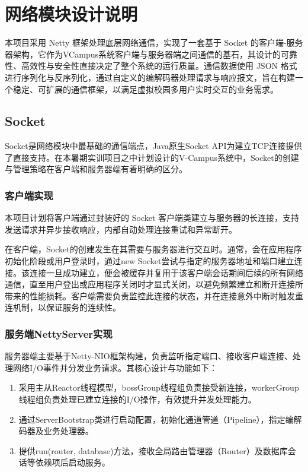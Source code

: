 \ifx\maindoc\undefined
\fi

\section{网络模块设计说明}
本项目采用 Netty 框架处理底层网络通信，实现了一套基于 Socket 的客户端-服务器架构，它作为VCampus系统客户端与服务器端之间通信的基石，其设计的可靠性、高效性与安全性直接决定了整个系统的运行质量。通信数据使用 JSON 格式进行序列化与反序列化，通过自定义的编解码器处理请求与响应报文，旨在构建一个稳定、可扩展的通信框架，以满足虚拟校园多用户实时交互的业务需求。

\subsection{Socket}
Socket是网络模块中最基础的通信端点，Java原生Socket API为建立TCP连接提供了直接支持。在本暑期实训项目之中计划设计的V-Campus系统中，Socket的创建与管理策略在客户端和服务器端有着明确的区分。

\subsubsection{客户端实现}
本项目计划将客户端通过封装好的 Socket 客户端类建立与服务器的长连接，支持发送请求并异步接收响应，内部自动处理连接重试和异常断开。

在客户端，Socket的创建发生在其需要与服务器进行交互时。通常，会在应用程序初始化阶段或用户登录时，通过new Socket尝试与指定的服务器地址和端口建立连接。该连接一旦成功建立，便会被缓存并复用于该客户端会话期间后续的所有网络通信，直至用户登出或应用程序关闭时才显式关闭，以避免频繁建立和断开连接所带来的性能损耗。客户端需要负责监控此连接的状态，并在连接意外中断时触发重连机制，以保证服务的连续性。

\subsubsection{服务端\textbf{NettyServer}实现}
服务器端主要基于Netty-NIO框架构建，负责监听指定端口、接收客户端连接、处理网络I/O事件并分发业务请求。其核心设计与功能如下：
\begin{enumerate}
    \item 采用主从Reactor线程模型，bossGroup线程组负责接受新连接，workerGroup线程组负责处理已建立连接的I/O操作，有效提升并发处理能力。
    \item 通过ServerBootstrap类进行启动配置，初始化通道管道（Pipeline），指定编解码器及业务处理器。
    \item 提供run(router, database)方法，接收全局路由管理器（Router）及数据库会话等依赖项后启动服务。
\end{enumerate}

